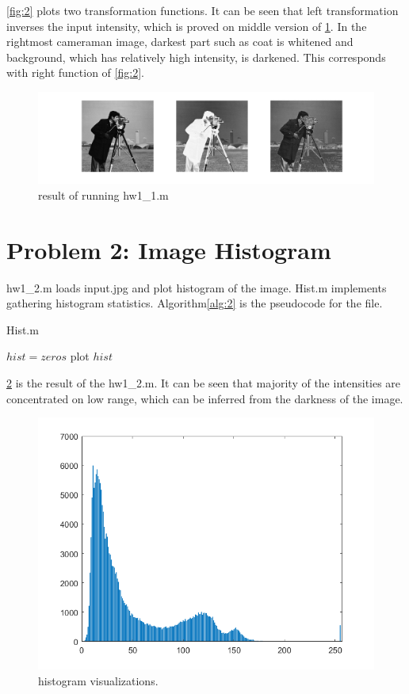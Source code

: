\documentclass[extendedabs]{bmvc2k}
\begin{document}
\figurename{\ref{fig:2}} plots two transformation functions. It can be seen that left transformation
inverses the input intensity, which is proved on middle version of \figurename{\ref{fig:1}}.
In the rightmost cameraman image, darkest part such as coat is whitened and background, which has relatively
high intensity, is darkened. This corresponds with right function of \figurename{\ref{fig:2}}.  

\begin{figure}[h]
    \centering
    \includegraphics[width=\linewidth]{hw1_1}
    \caption{result of running hw1\_1.m}
    \label{fig:1}
    \vspace{-2mm}
\end{figure}

\section*{Problem 2: Image Histogram}

hw1\_2.m loads input.jpg and plot histogram of the image.
Hist.m implements gathering histogram statistics.
Algorithm\ref{alg:2} is the pseudocode for the file.

\begin{algorithm}
\caption{Hist.m}
\label{alg:2}
$hist = zeros$\;
plot $hist$\;
\end{algorithm}

\figurename{\ref{fig:3}} is the result of the hw1\_2.m. It can be seen that majority of the intensities
are concentrated on low range, which can be inferred from the darkness of the image.

\begin{figure}[h]
    \centering
    \includegraphics[width=0.6\linewidth]{hw1_2}
    \caption{histogram visualizations.}
    \label{fig:3}
    \vspace{-2mm}
\end{figure}
\end{document}
